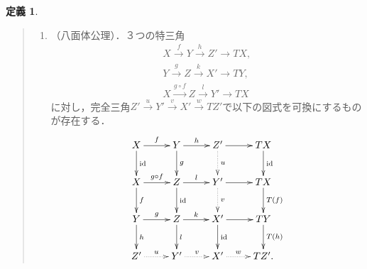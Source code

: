 \documentclass[leqno, 10pt, a4paper, dvipdfmx]{jsarticle}
\theoremstyle{definition}
\newtheorem{Definition}[Axiom]{定義}
\numberwithin{equation}{section}
\newcommand{\id}{\mathop{\mathrm{id}}\nolimits}
\theoremstyle{mystyle}
\begin{document}
\begin{Definition}
\begin{description}
\begin{quote}
\begin{enumerate}
\begin{equation*}
{{                    X'\ar[r]^-{f'}
                    &
                    Y'
                    }}
                \end{equation*}
                は特三角の射に埋め込める．\label{TR4}
                \item\label{TR5}（八面体公理）．３つの特三角
                \begin{align*}
                    X\overset{f}{\to}Y\overset{h}{\to} Z'\to TX, \\
                    Y\overset{g}{\to}Z\overset{k}{\to} X'\to TY,\\
                    X\overset{g\circ f}{\longrightarrow}
                    Z\overset{l}{\to} Y'\to TX
                \end{align*}
                に対し，完全三角\(
                    Z'\overset{u}{\to}
                    Y'\overset{v}{\to} 
                    X'\overset{w}{\to} 
                    TZ'
                \)で以下の図式を可換にするものが存在する．
                \[\vcenter{\xymatrix{
                    X
                    \ar[r]^-{f} 
                    \ar[d]^-{\id}
                    & 
                    Y\ar[r]^-{h} 
                    \ar[d]^-{g}
                    & 
                    Z'\ar[r]^-{}
                    \ar@{..>}[d]^-{u}
                    & 
                    TX\ar[d]^-{\id}\\
                    X\ar[r]^-{g\circ f} 
                    \ar[d]^-{f}
                    & 
                    Z\ar[r]^-{l} 
                    \ar[d]^-{\id}
                    & 
                    Y'\ar[r]^-{}
                    \ar@{..>}[d]^-{v}
                    & 
                    TX\ar[d]^-{T(f)}\\
                    Y\ar[r]^-{g} 
                    \ar[d]^-{h}
                    & 
                    Z\ar[r]^-{k} 
                    \ar[d]^-{l}
                    & 
                    X'\ar[r]^-{}
                    \ar[d]^-{\id}
                    & 
                    TY\ar[d]^-{T(h)}\\
                    Z'
                    \ar@{..>}[r]^-{u} 
                    & 
                    Y'\ar@{..>}[r]^-{v} 
                    & 
                    X'\ar@{..>}[r]^-{w}
                    & 
                    TZ'.
                }}\]
            \end{enumerate}    
        \end{quote}
    \end{description}
\end{Definition}
\end{document}

